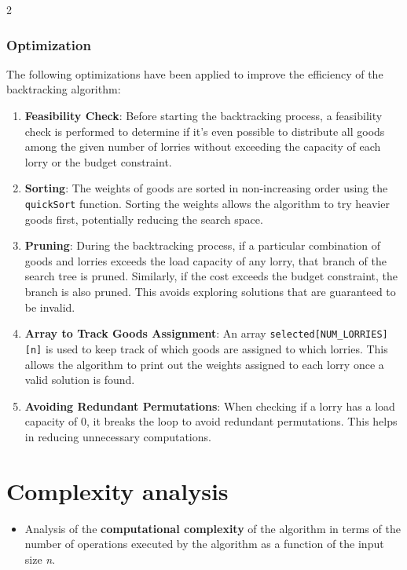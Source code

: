 \documentclass{article}
\begin{document}
\begin{multicols}{2}
\subsubsection{Optimization}
The following optimizations have been applied to improve the efficiency of the backtracking algorithm:
\begin{enumerate}
	\item \textbf{Feasibility Check}: Before starting the backtracking process, a feasibility check is performed to determine if it's even possible to distribute all goods among the given number of lorries without exceeding the capacity of each lorry or the budget constraint.

	\item \textbf{Sorting}: The weights of goods are sorted in non-increasing order using the \texttt{quickSort} function. Sorting the weights allows the algorithm to try heavier goods first, potentially reducing the search space.

	\item \textbf{Pruning}: During the backtracking process, if a particular combination of goods and lorries exceeds the load capacity of any lorry, that branch of the search tree is pruned. Similarly, if the cost exceeds the budget constraint, the branch is also pruned. This avoids exploring solutions that are guaranteed to be invalid.

	\item \textbf{Array to Track Goods Assignment}: An array \texttt{selected[NUM\_LORRIES][n]} is used to keep track of which goods are assigned to which lorries. This allows the algorithm to print out the weights assigned to each lorry once a valid solution is found.

	\item \textbf{Avoiding Redundant Permutations}: When checking if a lorry has a load capacity of 0, it breaks the loop to avoid redundant permutations. This helps in reducing unnecessary computations.
\end{enumerate}


\section{Complexity analysis}
\begin{itemize}
	\item Analysis of the \textbf{computational complexity} of the algorithm in terms of the number of operations
	      executed by the algorithm as a function of the input size \textit{n}.


\end{itemize}
\end{multicols}
\end{document}
